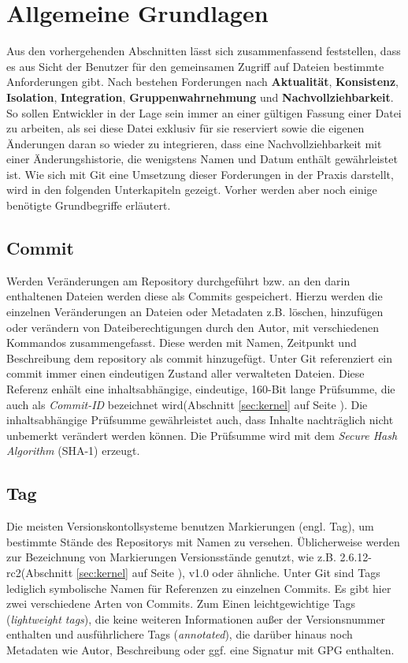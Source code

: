 \section{Allgemeine Grundlagen}\label{sec:Grundlagen}
Aus den vorhergehenden Abschnitten lässt sich zusammenfassend feststellen, dass
es aus Sicht der Benutzer für den gemeinsamen Zugriff auf Dateien bestimmte
Anforderungen gibt. Nach \cite[S.~37]{hagen:1678} bestehen Forderungen nach
\textbf{Aktualität}, \textbf{Konsistenz}, \textbf{Isolation},
\textbf{Integration}, \textbf{Gruppenwahrnehmung} und
\textbf{Nachvollziehbarkeit}. So sollen Entwickler in der Lage sein immer an
einer gültigen Fassung einer Datei zu arbeiten, als sei diese Datei exklusiv für
sie reserviert sowie die eigenen Änderungen daran so wieder zu integrieren, dass
eine Nachvollziehbarkeit mit einer Änderungshistorie, die wenigstens Namen und
Datum enthält gewährleistet ist. Wie sich mit Git eine Umsetzung dieser
Forderungen in der Praxis darstellt, wird in den folgenden Unterkapiteln
gezeigt. Vorher werden aber noch einige benötigte Grundbegriffe erläutert.

\subsection{Commit}\label{sec:commit}
Werden Veränderungen am Repository durchgeführt bzw. an den darin enthaltenen
Dateien werden diese als Commits gespeichert. Hierzu werden die einzelnen
Veränderungen an Dateien oder Metadaten z.B. löschen, hinzufügen oder verändern
von Dateiberechtigungen durch den Autor, mit verschiedenen Kommandos
zusammengefasst. Diese werden mit Namen, Zeitpunkt und Beschreibung dem
\gls{repository} als \gls{commit} hinzugefügt. Unter Git referenziert ein
\gls{commit} immer einen eindeutigen Zustand aller verwalteten Dateien. Diese
Referenz enhält eine inhaltsabhängige, eindeutige, 160-Bit lange Prüfsumme, die
auch als \textit{Commit-ID} bezeichnet wird(Abschnitt \ref{sec:kernel} auf Seite
\pageref{sec:kernel}). Die inhaltsabhängige Prüfsumme gewährleistet auch, dass
Inhalte nachträglich nicht unbemerkt verändert werden können. Die Prüfsumme
wird mit dem \textit{Secure Hash Algorithm} (\gls{SHA-1})
erzeugt.\cite[S.~20-21]{gitosp}

\subsection{Tag}\label{sec:tag}
Die meisten Versionskontollsysteme benutzen Markierungen (engl. Tag), um
bestimmte Stände des Repositorys mit Namen zu versehen. Üblicherweise werden
zur Bezeichnung von Markierungen Versionsstände genutzt, wie z.B.
2.6.12-rc2(Abschnitt \ref{sec:kernel} auf Seite \pageref{sec:kernel}), v1.0
oder ähnliche. Unter Git sind Tags lediglich symbolische Namen für Referenzen
zu einzelnen Commits. Es gibt hier zwei verschiedene Arten von Commits. Zum
Einen leichtgewichtige Tags (\textit{lightweight tags}), die keine weiteren
Informationen außer der Versionsnummer enthalten und ausführlichere Tags
(\textit{annotated}), die darüber hinaus noch Metadaten wie Autor, Beschreibung
oder ggf. eine Signatur mit GPG enthalten.\cite[S.~48]{progit}

